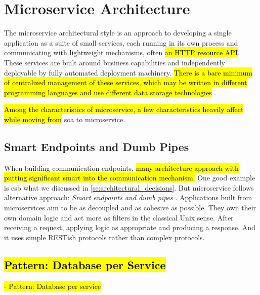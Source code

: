 \section{Microservice Architecture}
\label{se:microservice}

The microservice architectural style is an approach to developing a single application as a suite of small services, each running in its own process and communicating with lightweight mechanisms, often \hl{an HTTP resource API}. These services are built around business capabilities and independently deployable by fully automated deployment machinery. \hl{There is a bare minimum of centralized management of these services, which may be written in different programming languages and use different data storage technologies} \cite{LewisMicroservices}.

\hl{Among the characteristics of microservice, a few characteristics heavily affect while moving from} \acrshort{soa} to microservice.

\subsection{Smart Endpoints and Dumb Pipes}
\label{subse:dumb_pipes}

When building communication endpoints, \hl{many architecture approach with putting significant smart into the communication mechanism.} One good example is \acrshort{esb} what we discussed in \cref{se:architectural_decisions}. But microservice follows alternative approach: \emph{Smart endpoints and dumb pipes} \cite{LewisMicroservicesPipes}.
Applications built from microservices aim to be as decoupled and as cohesive as possible. They own their own domain logic and act more as filters in the classical Unix sense. After receiving a request, applying logic as appropriate and producing a response. And it uses simple RESTish protocols rather than complex protocols.

\subsection{\hl{Pattern: Database per Service}}
\label{subse:database_per_service}
\hl{- Pattern: Database per service} 

